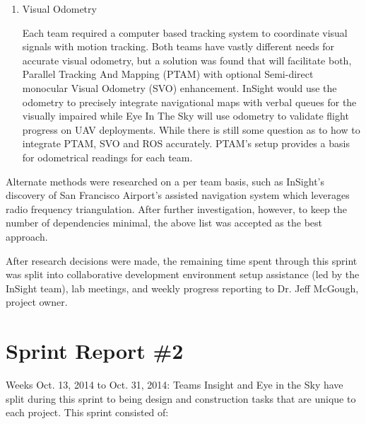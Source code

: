 \begin{enumerate}
\item Visual Odometry

Each team required a computer based tracking system to coordinate visual signals with motion tracking. Both teams have vastly different needs for accurate visual odometry, but a solution was found that will facilitate both, Parallel Tracking And Mapping (PTAM) with optional Semi-direct monocular Visual Odometry (SVO) enhancement. InSight would use the odometry to precisely integrate navigational maps with verbal queues for the visually impaired while Eye In The Sky will use odometry to validate flight progress on UAV deployments. While there is still some question as to how to integrate PTAM, SVO and ROS accurately. PTAM's setup provides a basis for odometrical readings for each team.

\end{enumerate}

Alternate methods were researched on a per team basis, such as InSight's discovery of San Francisco Airport's assisted navigation system which leverages radio frequency triangulation. After further investigation, however, to keep the number of dependencies minimal, the above list was accepted as the best approach.

After research decisions were made, the remaining time spent through this sprint was split into collaborative development environment setup assistance (led by the InSight team), lab meetings, and weekly progress reporting to Dr. Jeff McGough, project owner.


\section{Sprint Report \#2}
Weeks Oct. 13, 2014 to Oct. 31, 2014:
Teams Insight and Eye in the Sky have split during this sprint to being design and construction tasks that are unique to each project.   This sprint consisted of:

